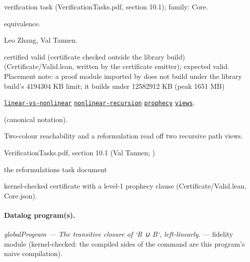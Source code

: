 \documentclass[10pt]{article}
\begin{document}
\begin{description}[leftmargin=2.6cm,style=nextline,itemsep=1pt]

\item[Category] verification task (VerificationTasks.pdf, section 10.1); family: Core.

\item[Kind] equivalence.

\item[Contributors] Leo Zhang, Val Tannen.

\item[Status] certified valid (certificate checked outside the library build) (Certificate/Valid.lean, written by the certificate emitter); expected valid. Placement note: a proof module imported by  does not build under the library build's 4194304 KB limit; it builds under 12582912 KB (peak 1651 MB)

\item[Tags] \hyperref[tag:linear-vs-nonlinear]{\texttt{linear-vs-nonlinear}} \hyperref[tag:nonlinear-recursion]{\texttt{nonlinear-recursion}} \hyperref[tag:prophecy]{\texttt{prophecy}} \hyperref[tag:views]{\texttt{views}}.

\item[Input]  (canonical notation).

\item[Summary] Two-colour reachability and a reformulation read off two recursive path views.

\item[Sources] {\raggedright VerificationTasks.pdf, section 10.1 (Val Tannen; ) \par the reformulations task document\par}

\item[Prophecy] kernel-checked certificate with a level-1 prophecy clause (Certificate/Valid.lean, Core.json).

\end{description}

\paragraph{Datalog program(s).}

{\raggedright\textit{globalProgram --- The transitive closure of `R ∪ B`, left-linearly.} --- fidelity module (kernel-checked: the compiled sides of the command are this program's naive compilation).\par}
\end{document}
